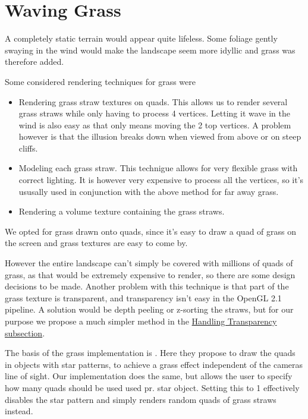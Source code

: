 \chapter{Waving Grass}


A completely static terrain would appear quite lifeless. Some foliage
gently swaying in the wind would make the landscape seem more idyllic
and grass was therefore added.

Some considered rendering techniques for grass were

\begin{itemize}
\item Rendering grass straw textures on quads. This allows us to
  render several grass straws while only having to process 4
  vertices. Letting it wave in the wind is also easy as that only
  means moving the 2 top vertices. A problem however is that the
  illusion breaks down when viewed from above or on steep cliffs.
\item Modeling each grass straw. This technigue allows for very
  flexible grass with correct lighting. It is however very expensive
  to process all the vertices, so it's ususally used in conjunction
  with the above method for far away grass.
\item Rendering a volume texture containing the grass straws.
\end{itemize}

We opted for grass drawn onto quads, since it's easy to draw a quad of
grass on the screen and grass textures are easy to come by.

However the entire landscape can't simply be covered with millions of
quads of grass, as that would be extremely expensive to render, so
there are some design decisions to be made. Another problem with this
technique is that part of the grass texture is transparent, and
transparency isn't easy in the OpenGL 2.1 pipeline. A solution would
be depth peeling or z-sorting the straws, but for our purpose we
propose a much simpler method in the
\hyperref[sec:transparency]{Handling Transparency subsection}.

The basis of the grass implementation is
. Here they propose to draw the quads in
objects with star patterns, to achieve a grass effect independent of
the cameras line of sight. Our implementation does the same, but
allows the user to specify how many quads should be used used pr. star
object. Setting this to 1 effectively disables the star pattern and
simply renders random quads of grass straws instead.

